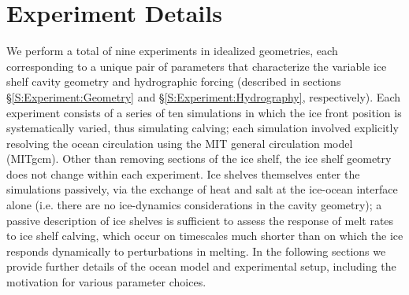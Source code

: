 \documentclass[draft]{agujournal2019}
\begin{document}
\section{Experiment Details}\label{S:Experiment}
We perform a total of nine experiments in idealized geometries, each corresponding to a unique pair of parameters that characterize the variable ice shelf cavity geometry and hydrographic forcing (described in sections \S\ref{S:Experiment:Geometry} and \S\ref{S:Experiment:Hydrography}, respectively). Each experiment consists of a series of ten simulations in which the ice front position is systematically varied, thus simulating calving; each simulation involved explicitly resolving the ocean circulation using the MIT general circulation model (MITgcm). Other than removing sections of the ice shelf, the ice shelf geometry does not change within each experiment. Ice shelves themselves enter the simulations passively, via the exchange of heat and salt at the ice-ocean interface alone (i.e. there are no ice-dynamics considerations in the cavity geometry); a passive description of ice shelves is sufficient to assess the response of melt rates to ice shelf calving, which occur on timescales much shorter than on which the ice responds dynamically to perturbations in melting. In the following sections we provide further details of the ocean model and experimental setup, including the motivation for various parameter choices.
\end{document}
